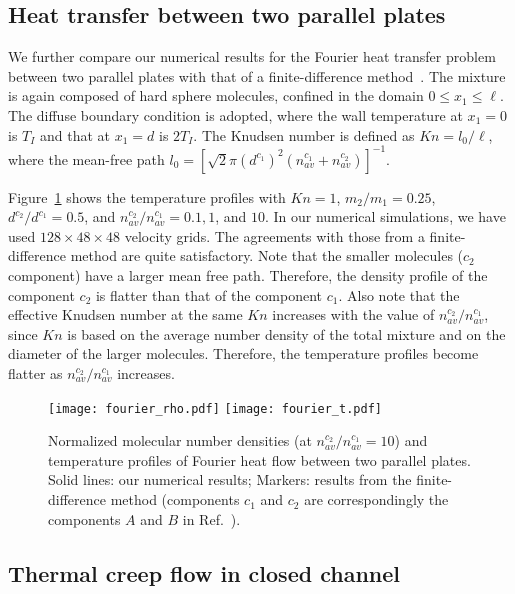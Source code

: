 \subsection{Heat transfer between two parallel plates}

We further compare our numerical results for the Fourier heat transfer problem between two parallel plates with that of a finite-difference method~\cite{Kosuge2000}. The mixture is again composed of hard sphere molecules, confined in the domain $0\le{}x_1\le{\ell}$. The diffuse boundary condition is adopted, where the wall temperature at $x_1=0$ is $T_I$ and that at $x_1=d$ is $2T_{I}$. The Knudsen number is defined as $Kn=l_0/\ell$, where the mean-free path $l_0=[\sqrt{2}\pi(d^{c_1})^2(n_{av}^{c_1}+n_{av}^{c_2})]^{-1}$. 

Figure~\ref{fourier_mixture} shows the temperature profiles with $Kn=1$, $m_{2}/m_{1}=0.25$, $d^{c_2}/d^{c_1}=0.5$, and $n_{av}^{c_2}/n_{av}^{c_1}=0.1,1$, and $10$. In our numerical simulations, we have used $128\times48\times48$ velocity grids. The agreements with those from a finite-difference method are quite satisfactory. Note that the smaller molecules ($c_2$ component) have a larger mean free path. Therefore, the density profile of the component $c_2$ is flatter than that of the component $c_1$. Also note that the effective Knudsen number at the same $Kn$ increases with the value of $n_{av}^{c_2}/n_{av}^{c_1}$, since $Kn$ is based on the average number density of the total mixture and on the diameter of the larger molecules. Therefore, the temperature profiles become flatter as $n_{av}^{c_2}/n_{av}^{c_1}$ increases. 

\begin{figure}[tbp]
  \centering
  \texttt{[image: fourier\_rho.pdf]}
  \hskip 0.1cm
  \texttt{[image: fourier\_t.pdf]}
  \caption[Normalized molecular number densities (at $n^{c_2}_{av}/n^{c_1}_{av}=10$) and temperature profiles of Fourier heat flow between two parallel plates.]{Normalized molecular number densities (at $n^{c_2}_{av}/n^{c_1}_{av}=10$) and temperature profiles of Fourier heat flow between two parallel plates. Solid lines: our numerical results; Markers: results from the finite-difference method (components $c_1$ and $c_2$ are correspondingly the components $A$ and $B$ in  Ref.~\cite{Kosuge2000}).  }
  \label{fourier_mixture}
\end{figure}


\subsection{Thermal creep flow in closed channel}

